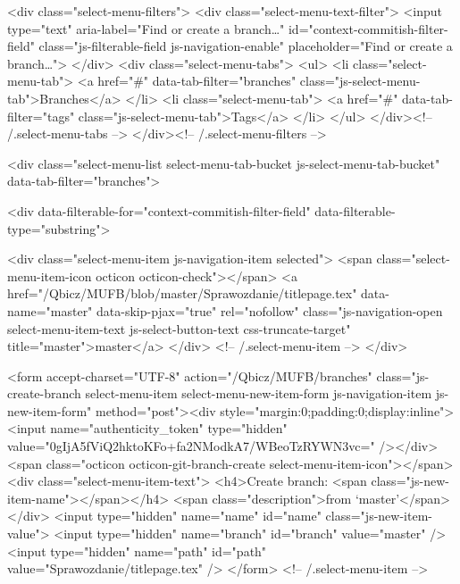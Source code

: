       <div class="select-menu-filters">
        <div class="select-menu-text-filter">
          <input type="text" aria-label="Find or create a branch…" id="context-commitish-filter-field" class="js-filterable-field js-navigation-enable" placeholder="Find or create a branch…">
        </div>
        <div class="select-menu-tabs">
          <ul>
            <li class="select-menu-tab">
              <a href="#" data-tab-filter="branches" class="js-select-menu-tab">Branches</a>
            </li>
            <li class="select-menu-tab">
              <a href="#" data-tab-filter="tags" class="js-select-menu-tab">Tags</a>
            </li>
          </ul>
        </div><!-- /.select-menu-tabs -->
      </div><!-- /.select-menu-filters -->

      <div class="select-menu-list select-menu-tab-bucket js-select-menu-tab-bucket" data-tab-filter="branches">

        <div data-filterable-for="context-commitish-filter-field" data-filterable-type="substring">


            <div class="select-menu-item js-navigation-item selected">
              <span class="select-menu-item-icon octicon octicon-check"></span>
              <a href="/Qbicz/MUFB/blob/master/Sprawozdanie/titlepage.tex"
                 data-name="master"
                 data-skip-pjax="true"
                 rel="nofollow"
                 class="js-navigation-open select-menu-item-text js-select-button-text css-truncate-target"
                 title="master">master</a>
            </div> <!-- /.select-menu-item -->
        </div>

          <form accept-charset="UTF-8" action="/Qbicz/MUFB/branches" class="js-create-branch select-menu-item select-menu-new-item-form js-navigation-item js-new-item-form" method="post"><div style="margin:0;padding:0;display:inline"><input name="authenticity_token" type="hidden" value="0gIjA5fViQ2hktoKFo+fa2NModkA7/WBeoTzRYWN3vc=" /></div>
            <span class="octicon octicon-git-branch-create select-menu-item-icon"></span>
            <div class="select-menu-item-text">
              <h4>Create branch: <span class="js-new-item-name"></span></h4>
              <span class="description">from ‘master’</span>
            </div>
            <input type="hidden" name="name" id="name" class="js-new-item-value">
            <input type="hidden" name="branch" id="branch" value="master" />
            <input type="hidden" name="path" id="path" value="Sprawozdanie/titlepage.tex" />
          </form> <!-- /.select-menu-item -->

